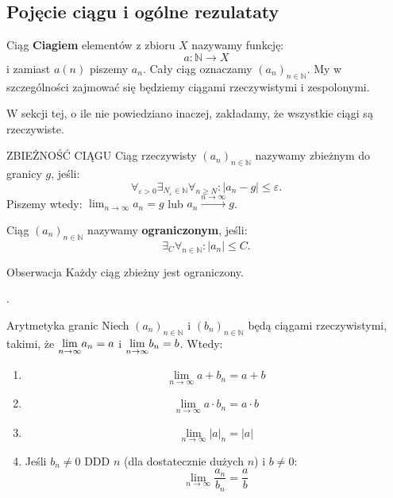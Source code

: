 \documentclass{article}
\numberwithin{defi}{section}
\numberwithin{theo}{section}
\numberwithin{defi}{section}
\newcommand{\N}{\mathbb{N}}
\newcommand{\oo}{\infty}
\newcommand{\eps}{\varepsilon}
\newcommand{\ciag}[1]{(#1_{n})_{n \in \N}}
\newcommand{\gras}[2]{\lim_{#1 \to \oo} #2_{#1}}
\newcommand{\lgras}[2]{\mathlarger{\lim}_{#1 \to \oo} #2_{#1}}
\begin{document}
\subsection{Pojęcie ciągu i ogólne rezulataty}
\begin{defr}{Ciąg}
    \textbf{Ciagiem} elementów z zbioru $X$ nazywamy funkcję:
    \begin{equation}
        a: \N \to X
    \end{equation}
    i zamiast $a(n)$ piszemy $a_n$. Cały ciąg oznaczamy $(a_n)_{n \in \N}$. My w szczególności zajmować się będziemy ciągami rzeczywistymi i zespolonymi.
\end{defr}
W sekcji tej, o ile nie powiedziano inaczej, zakładamy, że wszystkie ciągi są rzeczywiste.
\begin{defr}{ZBIEŻNOŚĆ CIĄGU}
    Ciąg rzeczywisty $\ciag{a}$ nazywamy zbieżnym do granicy $g$, jeśli:
    \begin{equation}
        \forall_{\eps > 0} \exists_{N_{\eps} \in \N} \forall_{n \geqslant N}: |a_n - g| \leqslant \eps.
    \end{equation}
    Piszemy wtedy: $\lim_{n \to \oo} a_n = g$ lub $a_n \xrightarrow{n \to \oo} g$.
\end{defr}

Ciąg $\ciag{a}$ nazywamy \textbf{ograniczonym}, jeśli:
\begin{equation}
    \exists_{C} \forall_{n \in \N}: |a_n| \leqslant C.
\end{equation}

\begin{obs}{Obserwacja}
    Każdy ciąg zbieżny jest ograniczony.
\end{obs}.

\begin{twier}{Arytmetyka granic}
    Niech $\ciag{a}$ i $\ciag{b}$ będą ciągami rzeczywistymi, takimi, że $\lgras{n}{a} = a$ i $\lgras{n}{b} = b$. Wtedy:
    \begin{enumerate}
        \item \begin{equation}
                  \gras{n}{a + b} = a + b
              \end{equation}
        \item \begin{equation}
                  \gras{n}{a \cdot b} = a \cdot b
              \end{equation}
        \item \begin{equation}
                  \gras{n}{|a|} = |a|
              \end{equation}
        \item Jeśli $b_n \neq 0$ DDD $n$ (dla dostatecznie dużych $n$) i $b \neq 0$:
              \begin{equation}
                  \lim_{n \to \oo} \frac{a_n}{b_n} = \frac{a}{b}
              \end{equation}

    \end{enumerate}
\end{twier}
\end{document}
